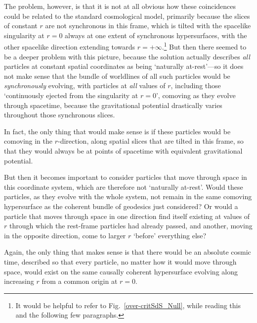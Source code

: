 The problem, however, is that it is not at all obvious how these coincidences could be related to the standard cosmological model, primarily because the slices of constant $r$ are not synchronous in this frame, which is tilted with the spacelike singularity at $r=0$ always at one extent of synchronous hypersurfaces, with the other spacelike direction extending towards $r=+\infty$.\footnote{It would be helpful to refer to Fig.~\ref{over-critSdS_Null}, while reading this and the following few paragraphs.} But then there seemed to be a deeper problem with this picture, because the solution actually describes \textit{all} particles at constant spatial coordinates as being `naturally at-rest'---so it does not make sense that the bundle of worldlines of all such particles would be \textit{synchronously} evolving, with particles at \textit{all} values of $r$, including those `continuously ejected from the singularity at $r=0$', comoving as they evolve through spacetime, because the gravitational potential drastically varies throughout those synchronous slices. 

In fact, the only thing that would make sense is if these particles would be comoving in the $r$-direction, along spatial slices that are tilted in this frame, so that they would always be at points of spacetime with equivalent gravitational potential.

But then it becomes important to consider particles that move through space in this coordinate system, which are therefore not `naturally at-rest'. Would these particles, as they evolve with the whole system, not remain in the same comoving hypersurface as the coherent bundle of geodesics just considered? Or would a particle that moves through space in one direction find itself existing at values of $r$ through which the rest-frame particles had already passed, and another, moving in the opposite direction, come to larger $r$ `before' everything else?

Again, the only thing that makes sense is that there would be an absolute cosmic time, described so that every particle, no matter how it would move through space, would exist on the same causally coherent hypersurface evolving along increasing $r$ from a common origin at $r=0$.

